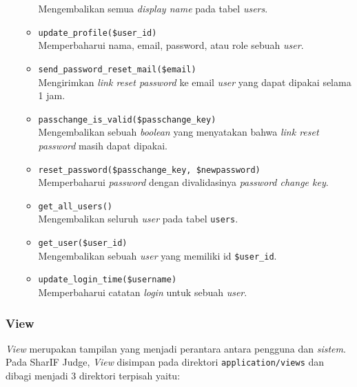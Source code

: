 \begin{itemize}
\begin{itemize}
                        Mengembalikan semua \textit{display name} pada tabel \textit{users}.
                  \item \verb|update_profile($user_id)| \\
                        Memperbaharui nama, email, password, atau role sebuah \textit{user}.
                  \item \verb|send_password_reset_mail($email)| \\
                        Mengirimkan \textit{link reset password} ke email \textit{user} yang dapat dipakai selama 1 jam.
                  \item \verb|passchange_is_valid($passchange_key)| \\
                        Mengembalikan sebuah \textit{boolean} yang menyatakan bahwa \textit{link reset password} masih dapat dipakai.
                  \item \verb|reset_password($passchange_key, $newpassword)| \\
                        Memperbaharui \textit{password} dengan divalidasinya \textit{password change key}.
                  \item \verb|get_all_users()| \\
                        Mengembalikan seluruh \textit{user} pada tabel \verb|users|.
                  \item \verb|get_user($user_id)| \\
                        Mengembalikan sebuah \textit{user} yang memiliki id \verb|$user_id|.
                  \item \verb|update_login_time($username)| \\
                        Memperbaharui catatan \textit{login} untuk sebuah \textit{user}.
            \end{itemize}


\end{itemize}

\subsubsection{View}
\label{sec:3:1:1:view}

\textit{View} merupakan tampilan yang menjadi perantara antara pengguna dan \textit{sistem}. Pada SharIF Judge, \textit{View} disimpan pada direktori \verb|application/views| dan dibagi menjadi 3 direktori terpisah yaitu:


